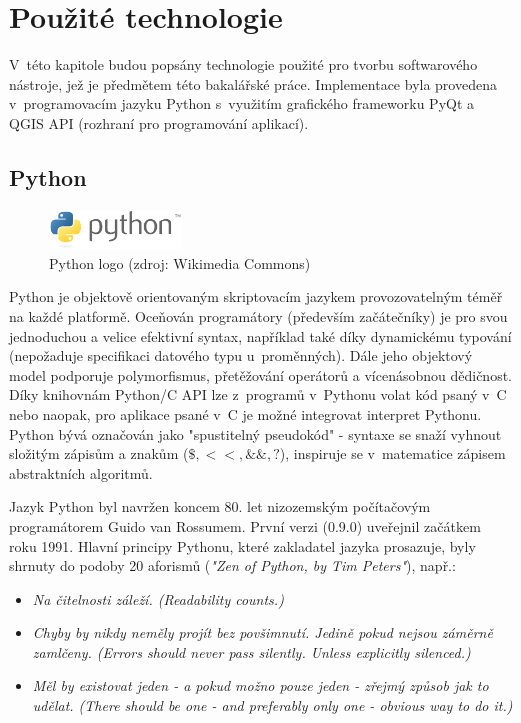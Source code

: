 \chapter{Použité technologie}
\label{3-technologie}

V~této kapitole budou popsány technologie použité pro tvorbu
softwarového nástroje, jež je předmětem této bakalářské
práce. Implementace byla provedena v~programo\-vacím jazyku Python
s~využitím grafického frameworku PyQt a QGIS API (rozhraní pro
programování aplikací).

\section{Python}
\begin{figure}[H] \centering
      \includegraphics[width=100pt]{./pictures/python.png}
      \caption[Python logo]{Python logo (zdroj: Wikimedia Commons)}
      \label{fig:python}
\end{figure}
  
Python je objektově orientovaným skriptovacím jazykem provozovatelným
téměř na každé platformě. Oceňován programátory (především
začátečníky) je pro svou jednoduchou a velice efektivní syntax,
například také díky dynamickému typování (nepožaduje specifikaci
datového typu u~proměnných). Dále jeho objektový model podporuje
polymorfismus, přetěžování operátorů a vícenásobnou dědičnost. 
Díky knihovnám Python/C API lze z~programů v~Pythonu
volat kód psaný v~C nebo naopak, pro aplikace psané v~C je možné
integrovat interpret Pythonu.  Python bývá označován jako "spustitelný
pseudokód" - syntaxe se snaží vyhnout složitým zápisům a znakům ($\$,
<<, \&\&, ?$), inspiruje se v~matematice zápisem abstraktních
algoritmů.\cite{learningPython}

Jazyk Python byl navržen koncem 80. let nizozemským počítačovým
programátorem Guido van Rossumem. První verzi (0.9.0) uveřejnil
začátkem roku 1991. Hlavní principy Pythonu, které zakladatel jazyka
prosazuje, byly shrnuty do podoby 20 aforismů (\textit{"Zen of Python,
by Tim Peters"}), např.:

\begin{itemize}

	\item \textit{Na čitelnosti záleží. (Readability counts.)}
			
	\item \textit{Chyby by nikdy neměly projít bez
povšimnutí. Jedině pokud nejsou záměrně zamlčeny. (Errors should never
pass silently. Unless explicitly silenced.)}
		
	\item \textit{Měl by existovat jeden - a pokud možno pouze
jeden - zřejmý způsob jak to udělat. (There should be one - and
preferably only one - obvious way to do it.)}
\end{itemize}

